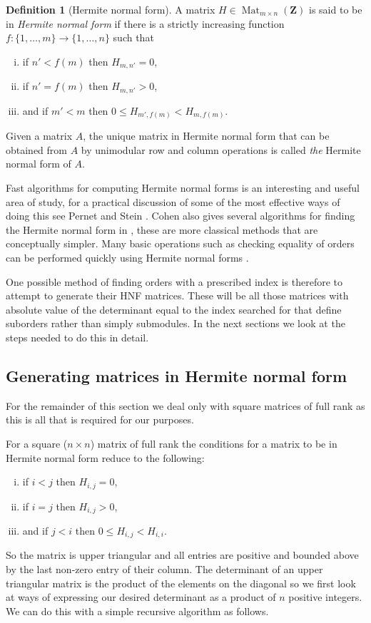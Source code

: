 \documentclass[12pt,a4paper,abstracton,bibtotoc]{scrreprt}
\theoremstyle{definition}
\newtheorem{defn}{Definition}
\newcommand{\ZZ}{\mathbf{Z}}
\DeclareMathOperator{\Mat}{Mat}
\begin{document}
\begin{defn}[Hermite normal form] %
A matrix $H\in\Mat_{m\times n}(\ZZ)$ is said to be in \emph{Hermite normal form} if there is a strictly increasing function $f\colon \{1, \ldots, m\} \to \{1,\ldots , n\}$ such that
\begin{enumerate}[i)]
\item if $n' < f(m)$ then $H_{m,n'} = 0$,
\item if $n' = f(m)$ then $H_{m,n'} > 0$,
\item and if $m' < m$ then $0\le H_{m',f(m)} < H_{m,f(m)}$.
\end{enumerate}

Given a matrix $A$, the unique matrix in Hermite normal form that can be obtained from $A$ by unimodular row and column operations is called \emph{the} Hermite normal form of $A$.
\end{defn}

Fast algorithms for computing Hermite normal forms is an interesting and useful area of study, for a practical discussion of some of the most effective ways of doing this see Pernet and Stein \cite{pernetstein}.
Cohen also gives several algorithms for finding the Hermite normal form in \cite{cohen93}, these are more classical methods that are conceptually simpler.
Many basic operations such as checking equality of orders can be performed quickly using Hermite normal forms \cite{cohen93}.  %

One possible method of finding orders with a prescribed index is therefore to attempt to generate their HNF matrices.
These will be all those matrices with absolute value of the determinant equal to the index searched for that define suborders rather than simply submodules.
In the next sections we look at the steps needed to do this in detail.

\subsection{Generating matrices in Hermite normal form}
For the remainder of this section we deal only with square matrices of full rank as this is all that is required for our purposes.

For a square ($n\times n$) matrix of full rank the conditions for a matrix to be in Hermite normal form reduce to the following:
\begin{enumerate}[i)]
\item if $i < j$ then $H_{i,j} = 0$,
\item if $i = j$ then $H_{i,j} > 0$,
\item and if $j < i$ then $0\le H_{i,j} < H_{i,i}$.
\end{enumerate}%
So the matrix is upper triangular and all entries are positive and bounded above by the last non-zero entry of their column.
The determinant of an upper triangular matrix is the product of the elements on the diagonal so we first look at ways of expressing our desired determinant as a product of $n$ positive integers.
We can do this with a simple recursive algorithm as follows.
\end{document}
